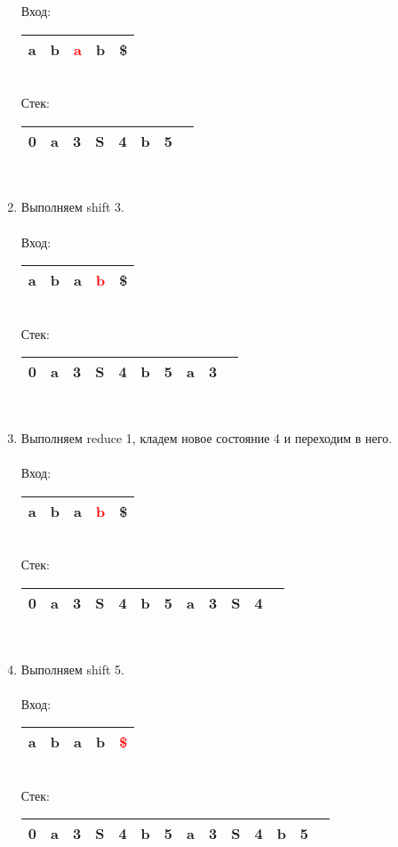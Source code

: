 \begin{example}
\begin{enumerate}
Вход: \,
\begin{tabular}[c]{ |c|c|c|c|c| }
    \hline a & b & \textcolor{red}{a} & b & \$ \\ \hline
\end{tabular}\\
Стек: \,
\begin{tabular}[c]{ |c|c|c|c|c|c|c|c }
    \hline 0 & a & 3 & S & 4 & b & 5 & \\ \hline
\end{tabular}
\\
\item Выполняем shift 3. \\ \\
Вход: \,
\begin{tabular}[c]{ |c|c|c|c|c| }
    \hline a & b & a & \textcolor{red}{b} & \$ \\ \hline
\end{tabular} \\
Стек: \,
\begin{tabular}[c]{ |c|c|c|c|c|c|c|c|c|c }
    \hline 0 & a & 3 & S & 4 & b & 5 & a & 3 & \\ \hline
\end{tabular}
\\
\item Выполняем reduce 1, кладем новое состояние 4 и переходим в него. \\ \\
Вход: \,
\begin{tabular}[c]{ |c|c|c|c|c| }
    \hline a & b & a & \textcolor{red}{b} & \$ \\ \hline
\end{tabular}\\
Стек: \,
\begin{tabular}[c]{ |c|c|c|c|c|c|c|c|c|c|c|c }
    \hline 0 & a & 3 & S & 4 & b & 5 & a & 3 & S & 4 & \\ \hline
\end{tabular}
\\
\item Выполняем shift 5. \\ \\
Вход: \,
\begin{tabular}[c]{ |c|c|c|c|c| }
    \hline a & b & a & b & \textcolor{red}{\$} \\ \hline
\end{tabular} \\
Стек: \,
\begin{tabular}[c]{ |c|c|c|c|c|c|c|c|c|c|c|c|c|c }
    \hline 0 & a & 3 & S & 4 & b & 5 & a & 3 & S & 4 & b & 5 & \\ \hline

\end{tabular}
\end{enumerate}
\end{example}
